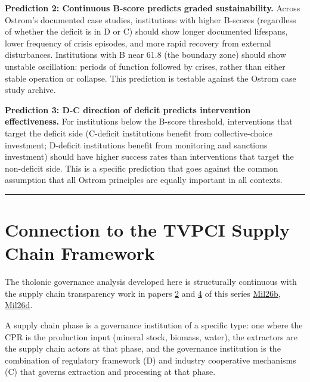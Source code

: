 \documentclass[12pt]{article}
\begin{document}
\textbf{Prediction 2: Continuous B-score predicts graded
sustainability.} Across Ostrom's documented case studies, institutions
with higher B-scores (regardless of whether the deficit is in D or C)
should show longer documented lifespans, lower frequency of crisis
episodes, and more rapid recovery from external disturbances.
Institutions with B near 61.8 (the boundary zone) should show unstable
oscillation: periods of function followed by crises, rather than either
stable operation or collapse. This prediction is testable against the
Ostrom case study archive.

\textbf{Prediction 3: D-C direction of deficit predicts intervention
effectiveness.} For institutions below the B-score threshold,
interventions that target the deficit side (C-deficit institutions
benefit from collective-choice investment; D-deficit institutions
benefit from monitoring and sanctions investment) should have higher
success rates than interventions that target the non-deficit side. This
is a specific prediction that goes against the common assumption that
all Ostrom principles are equally important in all contexts.

\begin{center}\rule{0.5\linewidth}{0.5pt}\end{center}

\section{Connection to the TVPCI Supply Chain Framework}\label{connection-to-the-tvpci-supply-chain-framework}

The tholonic governance analysis developed here is structurally
continuous with the supply chain transparency work in papers
\href{https://github.com/baardev/truevalue/blob/main/docnav/Research/papers/2_supply-chain-transparency-tvpci/2_supply-chain-transparency-tvpci.pdf}{2}
and
\href{https://github.com/baardev/truevalue/blob/main/docnav/Research/papers/4_game-theoretic-triadic-balance/4_game-theoretic-triadic-balance.pdf}{4}
of this series
\href{https://github.com/baardev/truevalue/blob/main/docnav/Research/papers/2_supply-chain-transparency-tvpci/2_supply-chain-transparency-tvpci.pdf}{Mil26b},
\href{https://github.com/baardev/truevalue/blob/main/docnav/Research/papers/4_game-theoretic-triadic-balance/4_game-theoretic-triadic-balance.pdf}{Mil26d}.

A supply chain phase is a governance institution of a specific type: one
where the CPR is the production input (mineral stock, biomass, water),
the extractors are the supply chain actors at that phase, and the
governance institution is the combination of regulatory framework (D)
and industry cooperative mechanisms (C) that governs extraction and
processing at that phase.
\end{document}
